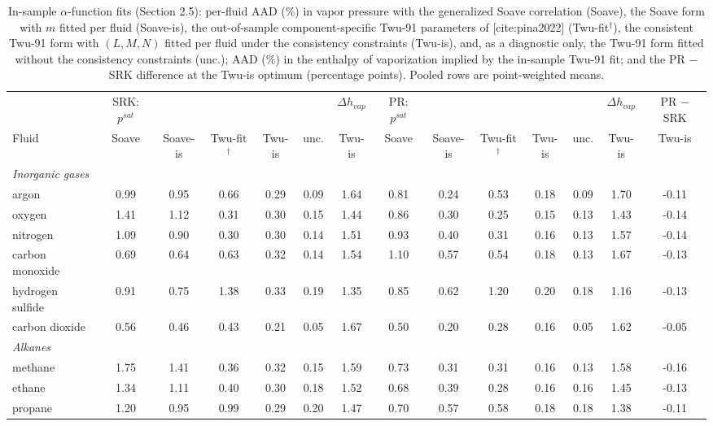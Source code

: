 \begin{table}[H]
\centering
\caption{In-sample $\alpha$-function fits (Section 2.5): per-fluid AAD (\%) in vapor pressure with the generalized Soave correlation (Soave), the Soave form with $m$ fitted per fluid (Soave-is), the out-of-sample component-specific Twu-91 parameters of [cite:pina2022] (Twu-fit$^{\dagger}$), the consistent Twu-91 form with $(L, M, N)$ fitted per fluid under the consistency constraints (Twu-is), and, as a diagnostic only, the Twu-91 form fitted without the consistency constraints (unc.); AAD (\%) in the enthalpy of vaporization implied by the in-sample Twu-91 fit; and the PR $-$ SRK difference at the Twu-is optimum (percentage points). Pooled rows are point-weighted means.}
\label{tab:tabS_insample}
\small
\begin{tabular}{lccccccccccccc}
\toprule
 & SRK: $p^{sat}$ &  &  &  &  & $\Delta h_{vap}$ & PR: $p^{sat}$ &  &  &  &  & $\Delta h_{vap}$ & PR $-$ SRK \\
Fluid & Soave & Soave-is & Twu-fit$^{\dagger}$ & Twu-is & unc. & Twu-is & Soave & Soave-is & Twu-fit$^{\dagger}$ & Twu-is & unc. & Twu-is & Twu-is \\
\midrule
\multicolumn{14}{l}{\emph{Inorganic gases}} \\
argon & 0.99 & 0.95 & 0.66 & 0.29 & 0.09 & 1.64 & 0.81 & 0.24 & 0.53 & 0.18 & 0.09 & 1.70 & -0.11 \\
oxygen & 1.41 & 1.12 & 0.31 & 0.30 & 0.15 & 1.44 & 0.86 & 0.30 & 0.25 & 0.15 & 0.13 & 1.43 & -0.14 \\
nitrogen & 1.09 & 0.90 & 0.30 & 0.30 & 0.14 & 1.51 & 0.93 & 0.40 & 0.31 & 0.16 & 0.13 & 1.57 & -0.14 \\
carbon monoxide & 0.69 & 0.64 & 0.63 & 0.32 & 0.14 & 1.54 & 1.10 & 0.57 & 0.54 & 0.18 & 0.13 & 1.67 & -0.13 \\
hydrogen sulfide & 0.91 & 0.75 & 1.38 & 0.33 & 0.19 & 1.35 & 0.85 & 0.62 & 1.20 & 0.20 & 0.18 & 1.16 & -0.13 \\
carbon dioxide & 0.56 & 0.46 & 0.43 & 0.21 & 0.05 & 1.67 & 0.50 & 0.20 & 0.28 & 0.16 & 0.05 & 1.62 & -0.05 \\
\multicolumn{14}{l}{\emph{Alkanes}} \\
methane & 1.75 & 1.41 & 0.36 & 0.32 & 0.15 & 1.59 & 0.73 & 0.31 & 0.31 & 0.16 & 0.13 & 1.58 & -0.16 \\
ethane & 1.34 & 1.11 & 0.40 & 0.30 & 0.18 & 1.52 & 0.68 & 0.39 & 0.28 & 0.16 & 0.16 & 1.45 & -0.13 \\
propane & 1.20 & 0.95 & 0.99 & 0.29 & 0.20 & 1.47 & 0.70 & 0.57 & 0.58 & 0.18 & 0.18 & 1.38 & -0.11 \\

\end{tabular}
\end{table}
